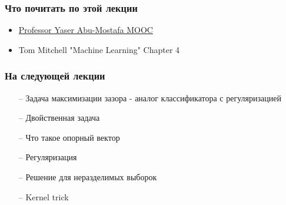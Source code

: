 \documentclass[10pt]{beamer}
\begin{document}
\appendix

\begin{frame}\frametitle{Что почитать по этой лекции}
  \begin{itemize}
    \item \href{http://work.caltech.edu/telecourse.html}{Professor Yaser Abu-Mostafa MOOC}
    \item Tom Mitchell "Machine Learning" Chapter 4
  \end{itemize}
\end{frame}

\begin{frame}\frametitle{На следующей лекции}
	\begin{itemize}
    	\item[--] Задача максимизации зазора - аналог классификатора с регуляризацией
    \item[--] Двойственная задача 
    \item[--] Что такое опорный вектор
    \item[--] Регуляризация
    \item[--] Решение для неразделимых выборок
    \item[--] Kernel trick
   	    	
	\end{itemize}
\end{frame}
\end{document}
